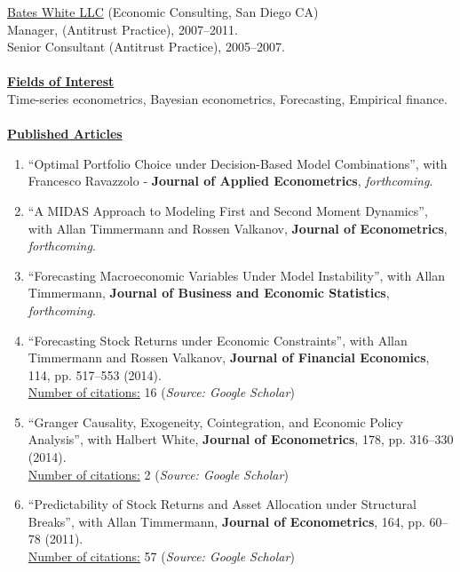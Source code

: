 \documentclass[12pt]{article}
\begin{document}
\underline{Bates White LLC} (Economic Consulting, San Diego CA)\\
Manager, (Antitrust Practice), 2007--2011.\\
Senior Consultant (Antitrust Practice), 2005--2007. \\ \\
\underline{\textbf{Fields of Interest}}\\
Time-series econometrics, Bayesian econometrics, Forecasting, Empirical finance.\\ \\
\underline{\textbf{Published Articles}}
\begin{enumerate}	

	\item ``Optimal Portfolio Choice under Decision-Based Model Combinations'', with Francesco Ravazzolo - \textbf{Journal of Applied Econometrics}, \textit{forthcoming}.
	
	\item ``A MIDAS Approach to Modeling First and Second Moment Dynamics'', with Allan Timmermann and Rossen Valkanov, \textbf{Journal of Econometrics}, \textit{forthcoming}.
	
  \item ``Forecasting Macroeconomic Variables Under Model Instability'', with Allan Timmermann, \textbf{Journal of Business and Economic Statistics},  \textit{forthcoming}. 
		
	\item ``Forecasting Stock Returns under Economic Constraints'', with Allan Timmermann and Rossen Valkanov, \textbf{Journal of Financial Economics}, 114, pp. 517--553 (2014). \\
	\underline{Number of citations:} 16 (\emph{Source: Google Scholar})
	
	\item ``Granger Causality, Exogeneity, Cointegration, and Economic Policy Analysis'', with Halbert White, \textbf{Journal of Econometrics}, 178, pp. 316--330 (2014). \\
	\underline{Number of citations:} 2 (\emph{Source: Google Scholar})
	
	\item ``Predictability of Stock Returns and Asset Allocation under Structural Breaks'', with Allan Timmermann, \textbf{Journal of Econometrics}, 164, pp. 60--78 (2011). \\
	\underline{Number of citations:} 57 (\emph{Source: Google Scholar})
	

\end{enumerate}
\end{document}
